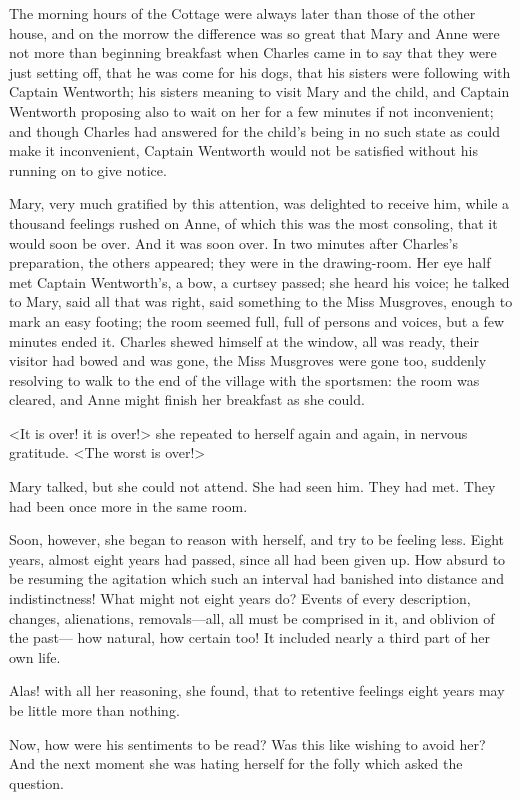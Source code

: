 The morning hours of the Cottage were always later than those of the other house, and on the morrow the difference was so great that Mary and Anne were not more than beginning breakfast when Charles came in to say that they were just setting off, that he was come for his dogs, that his sisters were following with Captain Wentworth; his sisters meaning to visit Mary and the child, and Captain Wentworth proposing also to wait on her for a few minutes if not inconvenient; and though Charles had answered for the child's being in no such state as could make it inconvenient, Captain Wentworth would not be satisfied without his running on to give notice.

Mary, very much gratified by this attention, was delighted to receive him, while a thousand feelings rushed on Anne, of which this was the most consoling, that it would soon be over. And it was soon over. In two minutes after Charles's preparation, the others appeared; they were in the drawing-room. Her eye half met Captain Wentworth's, a bow, a curtsey passed; she heard his voice; he talked to Mary, said all that was right, said something to the Miss Musgroves, enough to mark an easy footing; the room seemed full, full of persons and voices, but a few minutes ended it. Charles shewed himself at the window, all was ready, their visitor had bowed and was gone, the Miss Musgroves were gone too, suddenly resolving to walk to the end of the village with the sportsmen: the room was cleared, and Anne might finish her breakfast as she could.

<It is over! it is over!> she repeated to herself again and again, in nervous gratitude. <The worst is over!>

Mary talked, but she could not attend. She had seen him. They had met. They had been once more in the same room.

Soon, however, she began to reason with herself, and try to be feeling less. Eight years, almost eight years had passed, since all had been given up. How absurd to be resuming the agitation which such an interval had banished into distance and indistinctness! What might not eight years do? Events of every description, changes, alienations, removals—all, all must be comprised in it, and oblivion of the past— how natural, how certain too! It included nearly a third part of her own life.

Alas! with all her reasoning, she found, that to retentive feelings eight years may be little more than nothing.

Now, how were his sentiments to be read? Was this like wishing to avoid her? And the next moment she was hating herself for the folly which asked the question.


